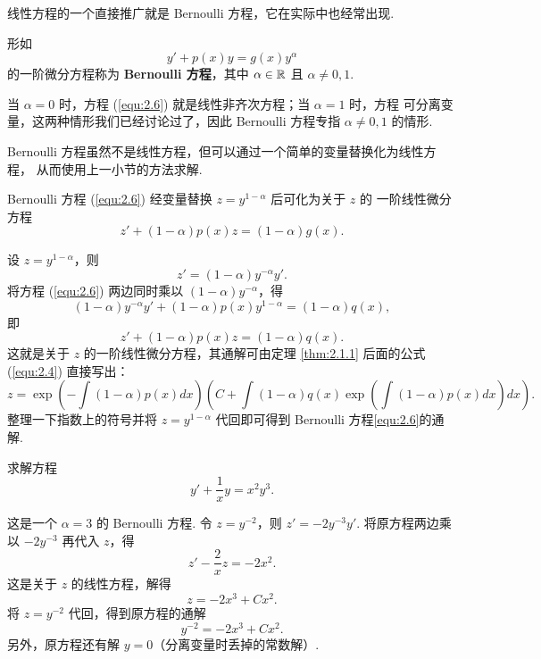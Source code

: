 线性方程的一个直接推广就是 Bernoulli 方程，它在实际中也经常出现.

\begin{deff}[(Bernoulli 方程)]
形如
\begin{equation}\label{equ:2.6}
y'+p(x)y=g(x)y^{\alpha}
\end{equation}
的一阶微分方程称为 \textbf{Bernoulli 方程}，其中 $\alpha\in\mathbb{R}$ 且 $\alpha\neq 0,1$.
\end{deff}

\begin{rmk}
当 $\alpha=0$ 时，方程 (\ref{equ:2.6}) 就是线性非齐次方程；当 $\alpha=1$ 时，方程
可分离变量，这两种情形我们已经讨论过了，因此 Bernoulli 方程专指 $\alpha\neq 0,1$
的情形.
\end{rmk}

Bernoulli 方程虽然不是线性方程，但可以通过一个简单的变量替换化为线性方程，
从而使用上一小节的方法求解.

\begin{thm}
Bernoulli 方程 (\ref{equ:2.6}) 经变量替换 $z=y^{1-\alpha}$ 后可化为关于 $z$ 的
一阶线性微分方程
\begin{equation}\label{equ:2.7}
z'+(1-\alpha)p(x)z=(1-\alpha)g(x).
\end{equation}
\end{thm}
\begin{pf1}
设 $z=y^{1-\alpha}$，则
\[
z'=(1-\alpha)y^{-\alpha}y'.
\]
将方程 (\ref{equ:2.6}) 两边同时乘以 $(1-\alpha)y^{-\alpha}$，得
\[
(1-\alpha)y^{-\alpha}y'+(1-\alpha)p(x)y^{1-\alpha}=(1-\alpha)q(x),
\]
即
\[
z'+(1-\alpha)p(x)z=(1-\alpha)q(x).
\]
这就是关于 $z$ 的一阶线性微分方程，其通解可由定理 \ref{thm:2.1.1} 后面的公式
(\ref{equ:2.4}) 直接写出：
\[
z=\exp\left(-\int (1-\alpha)p(x)dx\right)\left(C+\int (1-\alpha)q(x)\exp\left(\int (1-\alpha)p(x)dx\right)dx\right).
\]
整理一下指数上的符号并将 $z=y^{1-\alpha}$ 代回即可得到 Bernoulli 方程\ref{equ:2.6}的通解.
\end{pf1}

\begin{eg}
求解方程
\[
y'+\frac{1}{x}y=x^2y^3.
\]
\begin{pf2}
这是一个 $\alpha=3$ 的 Bernoulli 方程. 令 $z=y^{-2}$，则 $z'=-2y^{-3}y'$.
将原方程两边乘以 $-2y^{-3}$ 再代入 $z$，得
\[
z'-\frac{2}{x}z=-2x^2.
\]
这是关于 $z$ 的线性方程，解得
\[
z=-2x^3+Cx^2.
\]
将 $z=y^{-2}$ 代回，得到原方程的通解
\[
y^{-2}=-2x^3+Cx^2.
\]
另外，原方程还有解 $y=0$（分离变量时丢掉的常数解）.
\end{pf2}
\end{eg}

